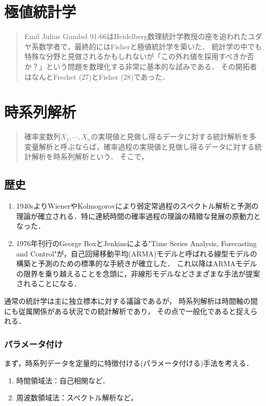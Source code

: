 \documentclass[uplatex,dvipdfmx]{jsreport}
\begin{document}
\chapter{極値統計学}

\begin{quotation}
    Emil Julius Gumbel 91-66はHeidelberg数理統計学教授の座を追われたユダヤ系数学者で，最終的にはFisherと極値統計学を築いた．
    統計学の中でも特殊な分野と見做されるかもしれないが「この外れ値を採用すべきか否か？」という問題を数理化する非常に基本的な試みである．
    その開拓者はなんとFrechet (27)とFisher (28)であった．
\end{quotation}

\chapter{時系列解析}

\begin{quotation}
    確率変数列$X_1,\cdots,X_n$の実現値と見做し得るデータに対する統計解析を多変量解析と呼ぶならば，確率過程の実現値と見做し得るデータに対する統計解析を時系列解析という．
    そこで，
\end{quotation}

\section{歴史}

\begin{enumerate}
    \item 1940sよりWienerやKolmogorovにより弱定常過程のスペクトル解析と予測の理論が確立される．特に連続時間の確率過程の理論の精緻な発展の原動力となった．
    \item 1976年刊行のGeorge BoxとJenkinsによる"Time Series Analysis, Forecasting and Control"が，自己回帰移動平均(ARMA)モデルと呼ばれる線型モデルの構築と予測のための標準的な手続きが確立した．
    これ以降はARMAモデルの限界を乗り越えることを念頭に，非線形モデルなどさまざまな手法が提案されることになる．
\end{enumerate}

通常の統計学は主に独立標本に対する議論であるが，
時系列解析は時間軸の間にも従属関係がある状況での統計解析であり，
その点で一般化であると捉えられる．

\subsection{パラメータ付け}

まず，時系列データを定量的に特徴付ける(パラメータ付ける)手法を考える．
\begin{enumerate}
    \item 時間領域法：自己相関など．
    \item 周波数領域法：スペクトル解析など，
\end{enumerate}
\end{document}
